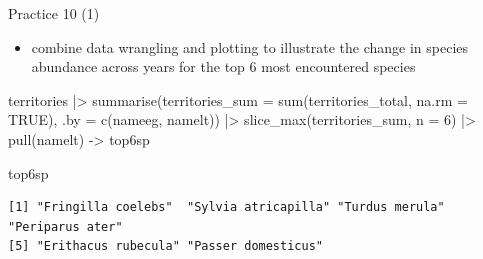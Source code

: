 \documentclass[
  ignorenonframetext,
  aspectratio=169,
  t]{beamer}
\newenvironment{Shaded}{\begin{snugshade}}{\end{snugshade}}
\newcommand{\AttributeTok}[1]{\textcolor[rgb]{0.40,0.45,0.13}{#1}}
\newcommand{\ConstantTok}[1]{\textcolor[rgb]{0.56,0.35,0.01}{#1}}
\newcommand{\DecValTok}[1]{\textcolor[rgb]{0.68,0.00,0.00}{#1}}
\newcommand{\FunctionTok}[1]{\textcolor[rgb]{0.28,0.35,0.67}{#1}}
\newcommand{\NormalTok}[1]{\textcolor[rgb]{0.00,0.23,0.31}{#1}}
\newcommand{\OtherTok}[1]{\textcolor[rgb]{0.00,0.23,0.31}{#1}}
\newcommand{\SpecialCharTok}[1]{\textcolor[rgb]{0.37,0.37,0.37}{#1}}
\providecommand{\tightlist}{%
  \setlength{\itemsep}{0pt}\setlength{\parskip}{0pt}}
\begin{document}
\begin{frame}[fragile]{Practice 10 (1)}
\protect{}\label{practice-10-1}
\begin{itemize}
\tightlist
\item
  combine data wrangling and plotting to illustrate the change in
  species abundance across years for the top 6 most encountered species
\end{itemize}

\footnotesize

\begin{Shaded}
\begin{Highlighting}[]
\NormalTok{territories }\SpecialCharTok{|\textgreater{}} 
    \FunctionTok{summarise}\NormalTok{(}\AttributeTok{territories\_sum =} \FunctionTok{sum}\NormalTok{(territories\_total, }\AttributeTok{na.rm =} \ConstantTok{TRUE}\NormalTok{),}
              \AttributeTok{.by =} \FunctionTok{c}\NormalTok{(nameeg, namelt)) }\SpecialCharTok{|\textgreater{}} 
    \FunctionTok{slice\_max}\NormalTok{(territories\_sum, }\AttributeTok{n =} \DecValTok{6}\NormalTok{) }\SpecialCharTok{|\textgreater{}} 
    \FunctionTok{pull}\NormalTok{(namelt) }\OtherTok{{-}\textgreater{}}\NormalTok{ top6sp}

\NormalTok{top6sp}
\end{Highlighting}
\end{Shaded}

\begin{verbatim}
[1] "Fringilla coelebs"  "Sylvia atricapilla" "Turdus merula"      "Periparus ater"    
[5] "Erithacus rubecula" "Passer domesticus" 
\end{verbatim}

\normalsize
\end{frame}
\end{document}
